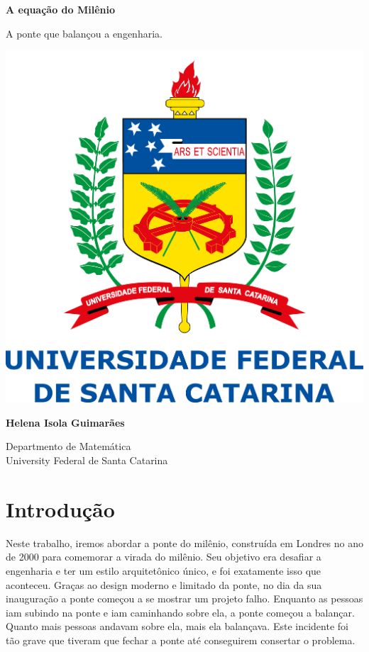 \documentclass[]{article}
\begin{document}
\begin{titlepage}
    \begin{center}
        \vspace*{1cm}
        \huge
        \textbf{A equação do Milênio} %
        
        \large
        \vspace{0.5cm}
         A ponte que balançou a engenharia.
             
        \vspace{0.5cm}

        \includegraphics[width=1\textwidth]{logoUfsc.png}

        \vspace{0.8cm}
        \textbf{Helena Isola Guimarães}
        \vspace{0.8cm}
             
        Departmento de Matemática\\
        University Federal de Santa Catarina\\
             
    \end{center}
\end{titlepage}

\section{Introdução}
Neste trabalho, iremos abordar a ponte do milênio, construída em Londres no ano de 2000 para comemorar
a virada do milênio. Seu objetivo era desafiar a engenharia e ter um estilo arquitetônico único, e foi exatamente isso que aconteceu.
Graças ao design moderno e limitado da ponte, no dia da sua inauguração a ponte começou a se mostrar um projeto falho.
Enquanto as pessoas iam subindo na ponte e iam caminhando sobre ela, a ponte começou a balançar. Quanto mais pessoas andavam sobre ela,
mais ela balançava. Este incidente foi tão grave que tiveram que fechar a ponte até conseguirem consertar o problema.
\end{document}
